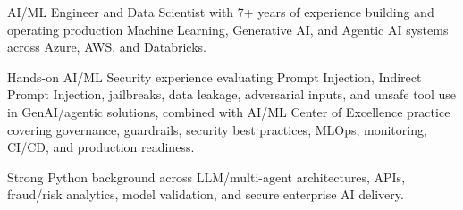 
{\small\color{cvtext}%
\noindent AI/ML Engineer and Data Scientist with 7+ years of experience building and operating production Machine Learning, Generative AI, and Agentic AI systems across Azure, AWS, and Databricks.\par
\vspace{0.14em}%
\noindent Hands-on AI/ML Security experience evaluating Prompt Injection, Indirect Prompt Injection, jailbreaks, data leakage, adversarial inputs, and unsafe tool use in GenAI/agentic solutions, combined with AI/ML Center of Excellence practice covering governance, guardrails, security best practices, MLOps, monitoring, CI/CD, and production readiness.\par
\vspace{0.14em}%
\noindent Strong Python background across LLM/multi-agent architectures, APIs, fraud/risk analytics, model validation, and secure enterprise AI delivery.\par
}
